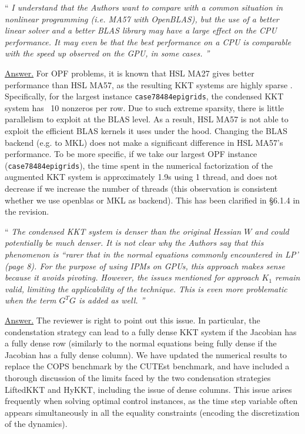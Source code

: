 \documentclass[10pt,a4paper]{article}
\newenvironment{quotereviewer}{\vspace{.5cm}{\underline\reviewername} ``\it\footnotesize}{''}
\newcommand{\answer}{\vspace{1mm}\underline{Answer.} }
\begin{document}
\begin{quotereviewer}
I understand that the Authors want to compare with a common situation in nonlinear programming (i.e. MA57 with OpenBLAS), but the use of a better linear solver and a better BLAS library may have a large effect on the CPU performance. It may even be that the best performance on a CPU is comparable with the speed up observed on the GPU, in some cases.
\end{quotereviewer}

\answer For OPF problems, it is known that HSL MA27 gives better performance than
HSL MA57, as the resulting KKT systems are highly sparse \cite{tasseffExploringBenefitsLinear2019}.
Specifically, for the largest instance {\tt case78484epigrids}, the condensed KKT system has ~10 nonzeros per row.
Due to such extreme sparsity, there is little parallelism to exploit at the BLAS level.
As a result, HSL MA57 is not able
to exploit the efficient BLAS kernels it uses under the hood. Changing the BLAS backend (e.g. to MKL)
does not make a significant difference in HSL MA57's performance.
To be more specific, if we take our largest OPF instance ({\tt case78484epigrids}),
the time spent in the numerical factorization of the augmented KKT system
is approximately 1.9s using 1 thread, and does not decrease if we increase
the number of threads (this observation is consistent whether we use openblas or MKL as backend).
This has been clarified in \S6.1.4 in the revision.


\begin{quotereviewer}
The condensed KKT system is denser than the original Hessian $W$ and could potentially be much denser. It is not clear why the Authors say that this phenomenon is ``rarer that in the normal equations commonly encountered in LP' (page 8). For the purpose of using IPMs on GPUs, this approach makes sense because it avoids pivoting. However, the issues mentioned for approach $K_1$ remain valid, limiting the applicability of the technique. This is even more problematic when the term $G^TG$ is added as well.
\end{quotereviewer}

\answer The reviewer is right to point out this issue.
In particular, the condenstation strategy can lead to a fully dense KKT system if the Jacobian has a fully dense row (similarly to the normal equations being fully dense if the Jacobian has a fully dense column).
We have updated the numerical
results to replace the COPS benchmark by the CUTEst benchmark, and have included a thorough
discussion of the limits faced by the two condensation strategies LiftedKKT and HyKKT,
including the issue of dense columns. This issue arises frequently when solving
optimal control instances, as the time step variable often appears simultaneously in all the
equality constraints (encoding the discretization of the dynamics).
\end{document}
